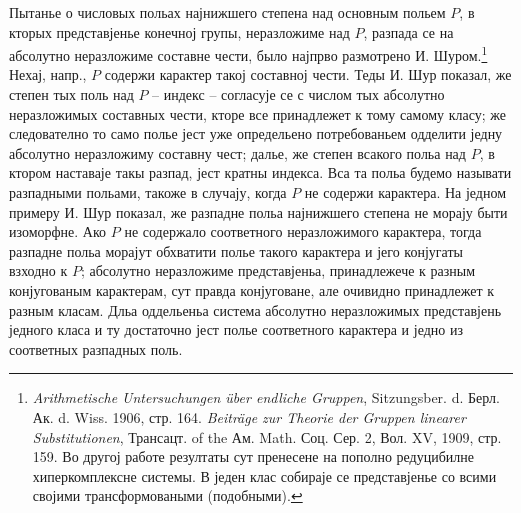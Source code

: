 \documentclass[11pt]{article}
\begin{document}
\setcounter{footnote}{0}

\noindent Пытанье о числовых польах најнижшего степена над основным польем $P$, в кторых представјенье конечној групы, неразложиме над $P$, разпада се на абсолутно неразложиме составне чести, было најпрво размотрено И. Шуром.\footnote{\emph{Arithmetische Untersuchungen über endliche Gruppen}, Sitzungsber. d. Берл. Ак. d. Wiss. 1906, стр. 164. \emph{Beiträge zur Theorie der Gruppen linearer Substitutionen}, Трансацт. of the Ам. Math. Соц. Сер. 2, Вол. XV, 1909, стр. 159. Во другој работе резултаты сут пренесене на пополно редуцибилне хиперкомплексне системы. В једен клас собираје се представјенье со всими својими трансформоваными (подобными).} Нехај, напр., $P$ содержи карактер такој составној чести. Теды И. Шур показал, же степен тых поль над $P$ -- индекс -- согласује се с числом тых абсолутно неразложимых составных чести, кторе все принадлежет к тому самому класу; же следователно то само полье јест уже определьено потребованьем одделити једну абсолутно неразложиму составну чест; далье, же степен всакого польа над $P$, в ктором наставаје такы разпад, јест кратны индекса. Вса та польа будемо называти разпадными польами, такоже в случају, когда $P$ не содержи карактера. На једном примеру И. Шур показал, же разпадне польа најнижшего степена не морају быти изоморфне. Ако $P$ не содержало соответного неразложимого карактера, тогда разпадне польа морајут обхватити полье такого карактера и јего конјугаты взходно к $P$; абсолутно неразложиме представјеньа, принадлежече к разным конјугованым карактерам, сут правда конјуговане, але очивидно принадлежет к разным класам. Дльа оддельеньа система абсолутно неразложимых представјень једного класа и ту достаточно јест полье соответного карактера и једно из соответных разпадных поль.
\end{document}
